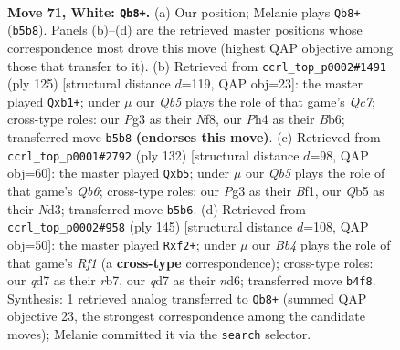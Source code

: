 \documentclass[11pt]{article}
\begin{document}
\clearpage

\begin{figure}[p]\centering
\begin{subfigure}{0.46\textwidth}\centering
\resizebox{\linewidth}{!}{%
\newchessgame
\chessboard[
  setfen={4k3/3q1p2/4bn2/1Q5n/1Bp4P/p4pP1/P6K/4R3 w - - 10 71},
  showmover=false,
  pgfstyle=straightmove, color=movearrow, markmove={b5-b8}
]}
\caption{}
\end{subfigure}\hfill
\begin{subfigure}{0.46\textwidth}\centering
\resizebox{\linewidth}{!}{%
\newchessgame
\chessboard[
  setfen={5n2/6pk/1b5p/p2QNP2/3P4/6PP/2q2B2/1R4K1 b - - 0 63},
  showmover=false,
  pgfstyle=straightmove, color=movearrow, markmove={c2-b1}
]}
\caption{}
\end{subfigure}
\\[4pt]
\begin{subfigure}{0.46\textwidth}\centering
\resizebox{\linewidth}{!}{%
\newchessgame
\chessboard[
  setfen={8/5bk1/1Q2n1p1/1p1pP3/3q4/3N1pP1/5P2/5BK1 w - - 2 67},
  showmover=false,
  pgfstyle=straightmove, color=movearrow, markmove={b6-b5}
]}
\caption{}
\end{subfigure}\hfill
\begin{subfigure}{0.46\textwidth}\centering
\resizebox{\linewidth}{!}{%
\newchessgame
\chessboard[
  setfen={5r1k/1R4p1/3N3p/1q2p3/6BP/3P2P1/1P3QK1/8 b - - 0 73},
  showmover=false,
  pgfstyle=straightmove, color=movearrow, markmove={f8-f2}
]}
\caption{}
\end{subfigure}
\caption{\textbf{Move 71, White: \texttt{Qb8+}.} (a) Our position; Melanie plays \texttt{Qb8+} (\texttt{b5b8}). Panels (b)--(d) are the retrieved master positions whose correspondence most drove this move (highest QAP objective among those that transfer to it). (b) Retrieved from \texttt{ccrl\_top\_p0002\#1491} (ply 125) [structural distance $d$=119, QAP obj=23]: the master played \texttt{Qxb1+}; under $\mu$ our \emph{Qb5} plays the role of that game's \emph{Qc7}; cross-type roles: our \emph{P}g3 as their \emph{N}f8, our \emph{P}h4 as their \emph{B}b6; transferred move \texttt{b5b8} \textbf{(endorses this move)}. (c) Retrieved from \texttt{ccrl\_top\_p0001\#2792} (ply 132) [structural distance $d$=98, QAP obj=60]: the master played \texttt{Qxb5}; under $\mu$ our \emph{Qb5} plays the role of that game's \emph{Qb6}; cross-type roles: our \emph{P}g3 as their \emph{B}f1, our \emph{Q}b5 as their \emph{N}d3; transferred move \texttt{b5b6}. (d) Retrieved from \texttt{ccrl\_top\_p0002\#958} (ply 145) [structural distance $d$=108, QAP obj=50]: the master played \texttt{Rxf2+}; under $\mu$ our \emph{Bb4} plays the role of that game's \emph{Rf1} (a \textbf{cross-type} correspondence); cross-type roles: our \emph{q}d7 as their \emph{r}b7, our \emph{q}d7 as their \emph{n}d6; transferred move \texttt{b4f8}. Synthesis: 1 retrieved analog transferred to \texttt{Qb8+} (summed QAP objective 23, the strongest correspondence among the candidate moves); Melanie committed it via the \texttt{search} selector.}
\label{fig:thought-m140}
\end{figure}
\end{document}
